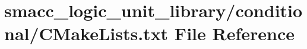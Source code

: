 \hypertarget{smacc__logic__unit__library_2conditional_2CMakeLists_8txt}{}\section{smacc\+\_\+logic\+\_\+unit\+\_\+library/conditional/\+C\+Make\+Lists.txt File Reference}
\label{smacc__logic__unit__library_2conditional_2CMakeLists_8txt}
